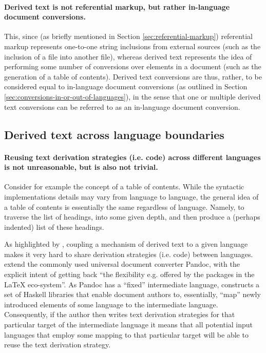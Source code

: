 \documentclass{scrreprt}
\begin{document}
\paragraph{Derived text is not referential markup, but rather in-language document conversions. } This, since (as briefly mentioned in Section \ref{sec:referential-markup}) referential markup represents one-to-one string inclusions from external sources (such as the inclusion of a file into another file), whereas derived text represents the idea of performing some number of conversions over elements in a document (such as the generation of a table of contents). Derived text conversions are thus, rather, to be considered equal to in-language document conversions (as outlined in Section \ref{sec:conversions-in-or-out-of-languages}), in the sense that one or multiple derived text conversions can be referred to as an in-language document conversion.



\subsection{Derived text across language boundaries}
\paragraph{Reusing text derivation strategies (i.e. code) across different languages is not unreasonable, but is also not trivial.} Consider for example the concept of a table of contents. While the syntactic implementations details may vary from language to language, the general idea of a table of contents is essentially the same regardless of language. Namely, to traverse the list of headings, into some given depth, and then produce a (perhaps indented) list of these headings.

As highlighted by \citet{krijnen}, coupling a mechanism of derived text to a given language makes it very hard to share derivation strategies (i.e. code) between languages.  \citet{krijnen} extend the commonly used universal document converter Pandoc\footnotePandoc{}, with the explicit intent of getting back ``the flexibility e.g. offered by the packages in the \LaTeX{} eco-system''. As Pandoc\footnotePandoc{} has a ``fixed'' intermediate language, \citet{krijnen} constructs a set of Haskell libraries that enable document authors to, essentially, ``map'' newly introduced elements of some language to the intermediate language. Consequently, if the author then writes text derivation strategies for that particular target of the intermediate language it means that all potential input languages that employ some mapping to that particular target will be able to reuse the text derivation strategy.
\end{document}
